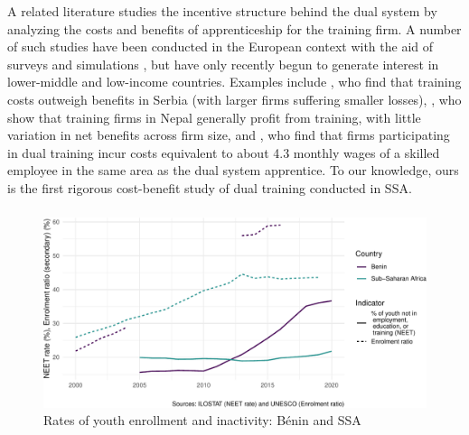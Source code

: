 \documentclass[
  a4paper, twoside, 12pt]{book}
\renewcommand{\hl}[1]{#1}
\newcommand{\hlc}[2][color]{}
\begin{document}
A related literature studies the incentive structure behind the dual system by analyzing the costs and benefits of apprenticeship for the training firm. A number of such studies have been conducted in the European context with the aid of surveys and simulations \autocites[see, e.g.,][]{muhlemann2016,muhlemann2019,muhlemann2014}, but have only recently begun to generate interest in lower-middle and low-income countries. Examples include \textcite{bolli2021}, who find that training costs outweigh benefits in Serbia (with larger firms suffering smaller losses), \textcite{bolli2020}, who show that training firms in Nepal generally profit from training, with little variation in net benefits across firm size, and \textcite{deamesti2021}, \hl{who find that firms participating in dual training incur costs equivalent to about 4.3 monthly wages of a skilled employee in the same area as the dual system apprentice.} To our knowledge, ours is the first rigorous cost-benefit study of dual training conducted in SSA. 

\hypertarget{section-2}{%
\subsubsection*{\texorpdfstring{\hlc[lightgray]{Country Context}}{}}\label{section-2}}


\begin{figure}[H]
\includegraphics{figures/fig-enrollment-1} \caption{Rates of youth enrollment and inactivity: Bénin and SSA}\label{fig:fig-enrollment}
\end{figure}
\end{document}
